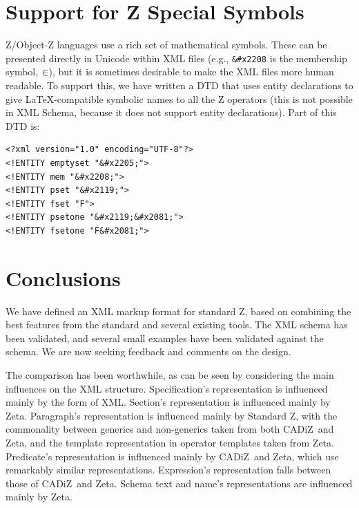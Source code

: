 \documentclass{llncs}  %
\newcommand{\CADiZ}{CADiZ}
\newcommand{\Zeta}{Zeta}
\begin{document}
\section{Support for Z Special Symbols}

Z/Object-Z languages use a rich set of mathematical symbols.  These
can be presented directly in Unicode within XML files (e.g., \verb!&#x2208!
is the membership symbol, $\in$), but it is sometimes desirable to make
the XML files more human readable.  To support this, we have written a DTD
that uses entity declarations to give \LaTeX-compatible symbolic names to
all the Z operators (this is not possible in XML Schema, because it does
not support entity declarations).  Part of this DTD is:

\begin{small}
\begin{verbatim} 
<?xml version="1.0" encoding="UTF-8"?>
<!ENTITY emptyset "&#x2205;">
<!ENTITY mem "&#x2208;">
<!ENTITY pset "&#x2119;">
<!ENTITY fset "F">
<!ENTITY psetone "&#x2119;&#x2081;">
<!ENTITY fsetone "F&#x2081;">
\end{verbatim}
\end{small}


 
\section{Conclusions}

We have defined an XML markup format for standard Z, based on
combining the best features from the standard and several existing 
tools.  The XML schema has been validated, and several small examples
have been validated against the schema.  We are now seeking feedback 
and comments on the design.

The comparison has been worthwhile,
as can be seen by considering the main influences on the XML structure.
Specification's representation is influenced mainly by the form of XML.
Section's representation is influenced mainly by \Zeta.
Paragraph's representation is influenced mainly by Standard Z,
with the commonality between generics and non-generics taken from
both \CADiZ\ and \Zeta,
and the template representation in operator templates taken from \Zeta.
Predicate's representation is influenced mainly by \CADiZ\ and \Zeta,
which use remarkably similar representations.
Expression's representation falls between those of \CADiZ\ and \Zeta.
Schema text and name's representations are influenced mainly by \Zeta.
\end{document}
